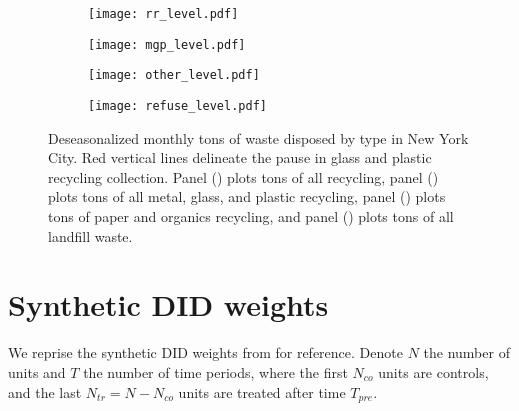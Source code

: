 \documentclass[12pt]{article}
\begin{document}
\begin{figure}[hb]
\centering
\begin{subfigure}[c]{.49\textwidth}
    \centering
    \texttt{[image: rr\_level.pdf]}
            \caption{}\label{fig:rr_level}
    \end{subfigure}
\begin{subfigure}[c]{.49\textwidth}
    \centering
    \texttt{[image: mgp\_level.pdf]}
        \caption{}\label{fig:mgp_level}
\end{subfigure}

\medskip

\begin{subfigure}[c]{.49\textwidth}
    \centering
    \vspace{0pt}
    \texttt{[image: other\_level.pdf]}
        \caption{}\label{fig:other_level}
\end{subfigure}
\begin{subfigure}[c]{.49\textwidth}
    \centering
    \texttt{[image: refuse\_level.pdf]}
        \caption{}\label{fig:refuse_level}
\end{subfigure}
    \caption{Deseasonalized monthly tons of waste disposed by type in New York City.  Red vertical lines delineate the pause in glass and plastic recycling collection.  Panel () plots tons of all recycling, panel () plots tons of all metal, glass, and plastic recycling, panel () plots tons of paper and organics recycling, and panel () plots tons of all landfill waste. } \label{fig:trends_levels}
\end{figure}

\clearpage

\section{Synthetic DID weights} \label{sec:weights}

We reprise the synthetic DID weights from \cite{arkhangelsky2021} for reference.  Denote \(N\) the number of units and \(T\) the number of time periods, where the first \(N_{co}\) units are controls, and the last \(N_{tr}=N-N_{co}\) units are treated after time \(T_{pre}\).
\end{document}
